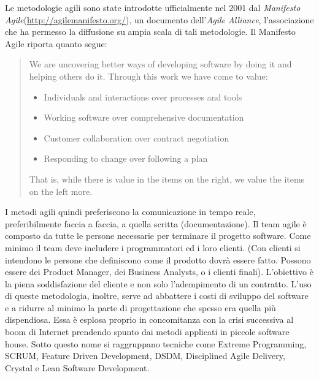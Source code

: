 Le metodologie agili sono state introdotte ufficialmente nel 2001 dal \textit{Manifesto Agile}(\url{http://agilemanifesto.org/}), un documento dell'\textit{Agile Alliance}, l'associazione che ha permesso la diffusione su ampia scala di tali metodologie.
Il Manifesto Agile riporta quanto segue:
\begin{quotation}
\begin{emph}
We are uncovering better ways of developing software by doing it and helping others do it. Through this work we have come to value:
\begin{itemize}
\item[ ] Individuals and interactions over processes and tools
\item[ ] Working software over comprehensive documentation
\item[ ] Customer collaboration over contract negotiation
\item[ ] Responding to change over following a plan
\end{itemize}
That is, while there is value in the items on the right, we value the items on the left more.
\end{emph}
\end{quotation}
I metodi agili quindi preferiscono la comunicazione in tempo reale, preferibilmente faccia a faccia, a quella scritta (documentazione). Il team agile è composto da tutte le persone necessarie per terminare il progetto software. Come minimo il team deve includere i programmatori ed i loro clienti. (Con clienti si intendono le persone che definiscono come il prodotto dovrà essere fatto. Possono essere dei Product Manager, dei Business Analysts, o i clienti finali). L'obiettivo è la piena soddisfazione del cliente e non solo l'adempimento di un contratto. 
L'uso di queste metodologia, inoltre, serve ad abbattere i costi di sviluppo del software e a ridurre al minimo la parte di progettazione che spesso era quella più dispendiosa. Essa è esplosa proprio in concomitanza con la crisi successiva al boom di Internet prendendo spunto dai metodi applicati in piccole software house. Sotto questo nome si raggruppano tecniche come Extreme Programming, SCRUM, Feature Driven Development, DSDM, Disciplined Agile Delivery, Crystal e Lean Software Development.

